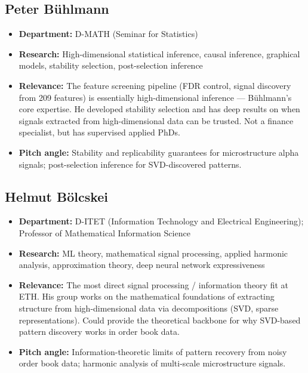 \documentclass[11pt,a4paper]{article}
\begin{document}
\subsection{Peter B\"uhlmann}
\begin{itemize}
  \item \textbf{Department:} D-MATH (Seminar for Statistics)
  \item \textbf{Research:} High-dimensional statistical inference, causal inference, graphical models, stability selection, post-selection inference
  \item \textbf{Relevance:} The feature screening pipeline (FDR control, signal discovery from 209 features) is essentially high-dimensional inference --- B\"uhlmann's core expertise. He developed stability selection and has deep results on when signals extracted from high-dimensional data can be trusted. Not a finance specialist, but has supervised applied PhDs.
  \item \textbf{Pitch angle:} Stability and replicability guarantees for microstructure alpha signals; post-selection inference for SVD-discovered patterns.
\end{itemize}

\subsection{Helmut B\"olcskei}
\begin{itemize}
  \item \textbf{Department:} D-ITET (Information Technology and Electrical Engineering); Professor of Mathematical Information Science
  \item \textbf{Research:} ML theory, mathematical signal processing, applied harmonic analysis, approximation theory, deep neural network expressiveness
  \item \textbf{Relevance:} The most direct signal processing / information theory fit at ETH. His group works on the mathematical foundations of extracting structure from high-dimensional data via decompositions (SVD, sparse representations). Could provide the theoretical backbone for why SVD-based pattern discovery works in order book data.
  \item \textbf{Pitch angle:} Information-theoretic limits of pattern recovery from noisy order book data; harmonic analysis of multi-scale microstructure signals.
\end{itemize}
\end{document}
